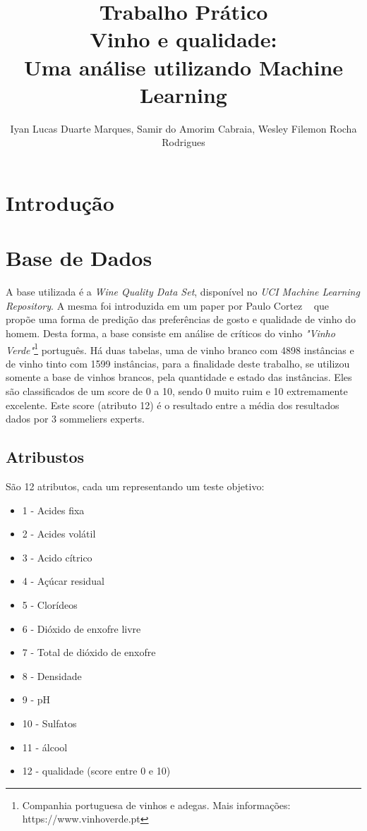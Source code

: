 \documentclass[12pt]{article}
\title{Trabalho Prático\\ Vinho e qualidade:\\ Uma análise utilizando Machine Learning}
\author{Iyan Lucas Duarte Marques\inst{1}, Samir do Amorim Cabraia\inst{1}, Wesley Filemon Rocha Rodrigues\inst{1}}
\begin{document}
\maketitle

\section{Introdução}

\section{Base de Dados}
A base utilizada é a \textit{Wine Quality Data Set}, disponível no \textit{UCI Machine Learning Repository}.
A mesma foi introduzida em um paper por Paulo Cortez ~\cite{vinho} que propõe uma forma de predição das preferências de gosto e qualidade de vinho do homem.
Desta forma, a base consiste em análise de críticos do vinho \textit{"Vinho Verde"}\footnote{
	Companhia portuguesa de vinhos e adegas. Mais informações: https://www.vinhoverde.pt
} português.
Há duas tabelas, uma de vinho branco com 4898 instâncias e de vinho tinto com 1599 instâncias, para a finalidade deste trabalho, se utilizou somente a base de vinhos brancos, pela quantidade e estado das instâncias.
Eles são classificados de um score de 0 a 10, sendo 0 muito ruim e 10 extremamente excelente. 
Este score (atributo 12) é o resultado entre a média dos resultados dados por 3 sommeliers experts. 

\subsection{Atribustos}
São 12 atributos, cada um representando um teste objetivo:
\begin{itemize}
	\item 1 - Acides fixa
	\item 2 - Acides volátil
	\item 3 - Acido cítrico
	\item 4 - Açúcar residual
	\item 5 - Clorídeos
	\item 6 - Dióxido de enxofre livre
	\item 7 - Total de dióxido de enxofre
	\item 8 - Densidade
	\item 9 - pH
	\item 10 - Sulfatos
	\item 11 - álcool
	\item 12 - qualidade (score entre 0 e 10)
\end{itemize}
\end{document}
